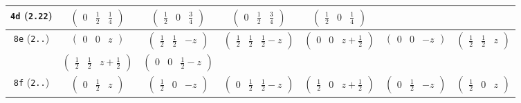 \documentclass[fleqn,9pt,landscape]{jsarticle}
\begin{document}
\begin{center}
\begin{longtable}{ccccccc}
{\tt 4d} ({\tt 2.22}) & $ \begin{pmatrix} 0 & \frac{1}{2} & \frac{1}{4} \end{pmatrix} $ & $ \begin{pmatrix} \frac{1}{2} & 0 & \frac{3}{4} \end{pmatrix} $ & $ \begin{pmatrix} 0 & \frac{1}{2} & \frac{3}{4} \end{pmatrix} $ & $ \begin{pmatrix} \frac{1}{2} & 0 & \frac{1}{4} \end{pmatrix} $ & $  $ & $  $ \\ \hline
{\tt 8e} ({\tt 2..}) & $ \begin{pmatrix} 0 & 0 & z \end{pmatrix} $ & $ \begin{pmatrix} \frac{1}{2} & \frac{1}{2} & - z \end{pmatrix} $ & $ \begin{pmatrix} \frac{1}{2} & \frac{1}{2} & \frac{1}{2} - z \end{pmatrix} $ & $ \begin{pmatrix} 0 & 0 & z + \frac{1}{2} \end{pmatrix} $ & $ \begin{pmatrix} 0 & 0 & - z \end{pmatrix} $ & $ \begin{pmatrix} \frac{1}{2} & \frac{1}{2} & z \end{pmatrix} $ \\
& $ \begin{pmatrix} \frac{1}{2} & \frac{1}{2} & z + \frac{1}{2} \end{pmatrix} $ & $ \begin{pmatrix} 0 & 0 & \frac{1}{2} - z \end{pmatrix} $ & $  $ & $  $ & $  $ & $  $ \\ \hline
{\tt 8f} ({\tt 2..}) & $ \begin{pmatrix} 0 & \frac{1}{2} & z \end{pmatrix} $ & $ \begin{pmatrix} \frac{1}{2} & 0 & - z \end{pmatrix} $ & $ \begin{pmatrix} 0 & \frac{1}{2} & \frac{1}{2} - z \end{pmatrix} $ & $ \begin{pmatrix} \frac{1}{2} & 0 & z + \frac{1}{2} \end{pmatrix} $ & $ \begin{pmatrix} 0 & \frac{1}{2} & - z \end{pmatrix} $ & $ \begin{pmatrix} \frac{1}{2} & 0 & z \end{pmatrix} $ \\

\end{longtable}
\end{center}
\end{document}
